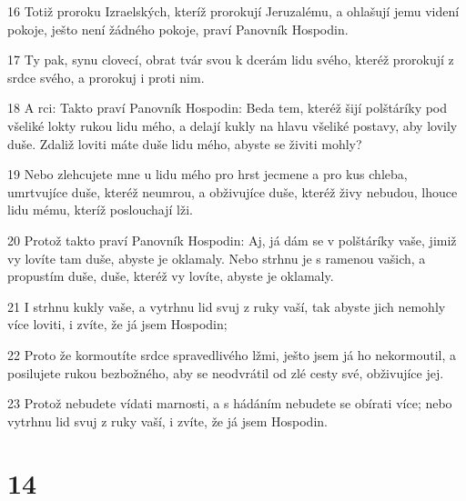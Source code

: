\par 16 Totiž proroku Izraelských, kteríž prorokují Jeruzalému, a ohlašují jemu videní pokoje, ješto není žádného pokoje, praví Panovník Hospodin.
\par 17 Ty pak, synu clovecí, obrat tvár svou k dcerám lidu svého, kteréž prorokují z srdce svého, a prorokuj i proti nim.
\par 18 A rci: Takto praví Panovník Hospodin: Beda tem, kteréž šijí polštáríky pod všeliké lokty rukou lidu mého, a delají kukly na hlavu všeliké postavy, aby lovily duše. Zdaliž loviti máte duše lidu mého, abyste se živiti mohly?
\par 19 Nebo zlehcujete mne u lidu mého pro hrst jecmene a pro kus chleba, umrtvujíce duše, kteréž neumrou, a obživujíce duše, kteréž živy nebudou, lhouce lidu mému, kteríž poslouchají lži.
\par 20 Protož takto praví Panovník Hospodin: Aj, já dám se v polštáríky vaše, jimiž vy lovíte tam duše, abyste je oklamaly. Nebo strhnu je s ramenou vašich, a propustím duše, duše, kteréž vy lovíte, abyste je oklamaly.
\par 21 I strhnu kukly vaše, a vytrhnu lid svuj z ruky vaší, tak abyste jich nemohly více loviti, i zvíte, že já jsem Hospodin;
\par 22 Proto že kormoutíte srdce spravedlivého lžmi, ješto jsem já ho nekormoutil, a posilujete rukou bezbožného, aby se neodvrátil od zlé cesty své, obživujíce jej.
\par 23 Protož nebudete vídati marnosti, a s hádáním nebudete se obírati více; nebo vytrhnu lid svuj z ruky vaší, i zvíte, že já jsem Hospodin.

\chapter{14}

